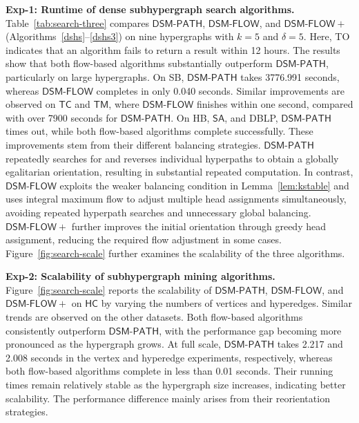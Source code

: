 \documentclass[twocolumn]{svjour3}
\newcommand{\kw}[1]{{\ensuremath{\mathsf{#1}}}\xspace}
\newcommand{\stitle}[1]{\par\noindent\textbf{#1}}
\begin{document}
\stitle{Exp-1: Runtime of dense subhypergraph search algorithms.}
Table~\ref{tab:search-three} compares \kw{DSM\text{-}PATH}, \kw{DSM\text{-}FLOW}, and \kw{DSM\text{-}FLOW+} (Algorithms~\ref{dshs}--\ref{dshs3}) on nine hypergraphs with $k=5$ and $\delta=5$. Here, TO indicates that an algorithm fails to return a result within 12 hours. The results show that both flow-based algorithms substantially outperform \kw{DSM\text{-}PATH}, particularly on large hypergraphs. On SB, \kw{DSM\text{-}PATH} takes 3776.991 seconds, whereas \kw{DSM\text{-}FLOW} completes in only 0.040 seconds. Similar improvements are observed on \kw{TC} and \kw{TM}, where \kw{DSM\text{-}FLOW} finishes within one second, compared with over 7900 seconds for \kw{DSM\text{-}PATH}. On HB, \kw{SA}, and DBLP, \kw{DSM\text{-}PATH} times out, while both flow-based algorithms complete successfully. These improvements stem from their different balancing strategies. \kw{DSM\text{-}PATH} repeatedly searches for and reverses individual hyperpaths to obtain a globally egalitarian orientation, resulting in substantial repeated computation. In contrast, \kw{DSM\text{-}FLOW} exploits the weaker balancing condition in Lemma~\ref{lem:kstable} and uses integral maximum flow to adjust multiple head assignments simultaneously, avoiding repeated hyperpath searches and unnecessary global balancing. \kw{DSM\text{-}FLOW+} further improves the initial orientation through greedy head assignment, reducing the required flow adjustment in some cases. Figure~\ref{fig:search-scale} further examines the scalability of the three algorithms.


\stitle{Exp-2: Scalability of subhypergraph mining algorithms.}
Figure~\ref{fig:search-scale} reports the scalability of \kw{DSM\text{-}PATH}, \kw{DSM\text{-}FLOW}, and \kw{DSM\text{-}FLOW+} on \kw{HC} by varying the numbers of vertices and hyperedges. Similar trends are observed on the other datasets. Both flow-based algorithms consistently outperform \kw{DSM\text{-}PATH}, with the performance gap becoming more pronounced as the hypergraph grows. At full scale, \kw{DSM\text{-}PATH} takes 2.217 and 2.008 seconds in the vertex and hyperedge experiments, respectively, whereas both flow-based algorithms complete in less than 0.01 seconds. Their running times remain relatively stable as the hypergraph size increases, indicating better scalability.
The performance difference mainly arises from their reorientation strategies. %
\end{document}
